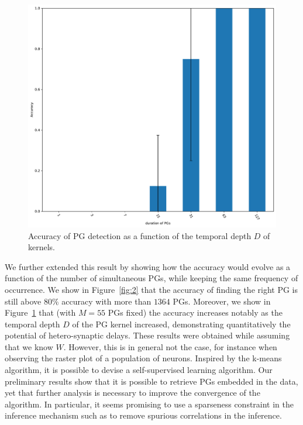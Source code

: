 \documentclass[11pt]{article}
\begin{document}
\begin{figure}
\vspace{-10pt}
\includegraphics[width=\linewidth]{figure_N_PG_time.pdf}
\vspace{-25pt}
{
\caption{Accuracy of PG detection as a function of the temporal depth $D$ of kernels.
}
\label{fig:3}
}
\vspace{-15pt}
\end{figure}
We further extended this result by showing how the accuracy would evolve as a function of the number of simultaneous PGs, while keeping the same frequency of occurrence. We show in Figure~\ref{fig:2} that the accuracy of finding the right PG is still above $80\%$ accuracy with more than $1364$ PGs. Moreover, we show in Figure~\ref{fig:3} that (with $M=55$ PGs fixed) the accuracy increases notably as the temporal depth $D$ of the PG kernel increased, demonstrating quantitatively the potential of hetero-synaptic delays. These results were obtained while assuming that we know $W$. However, this is in general not the case, for instance when observing the raster plot of a population of neurons. Inspired by the k-means algorithm, it is possible to devise a self-supervised learning algorithm. Our preliminary results show that it is possible to retrieve PGs embedded in the data, yet that further analysis is necessary to improve the convergence of the algorithm. In particular, it seems promising to use a sparseness constraint in the inference mechanism such as to remove spurious correlations in the inference.
\end{document}
